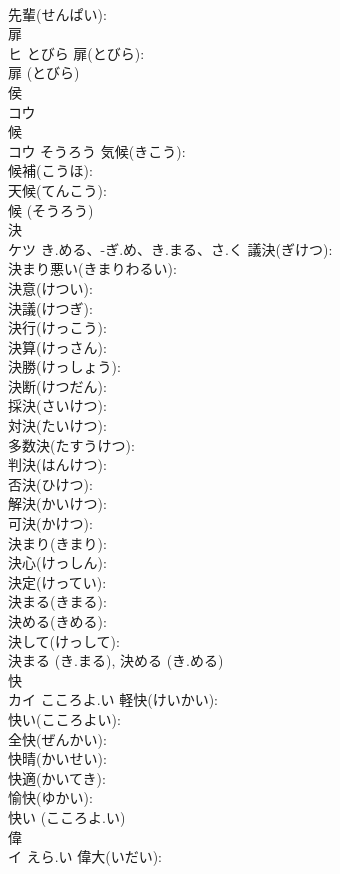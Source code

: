 \documentclass[8pt]{extreport}
\begin{document}
\begin{CJK}{UTF8}{min}
\\	先輩(せんぱい): 
\\	扉			
\\	ヒ	とびら	扉(とびら): 
\\	扉 (とびら)
\\	侯			
\\	コウ			
\\	候			
\\	コウ	そうろう	気候(きこう): 
\\	候補(こうほ): 
\\	天候(てんこう): 
\\	候 (そうろう)
\\	決			
\\	ケツ	き.める、-ぎ.め、き.まる、さ.く	議決(ぎけつ): 
\\	決まり悪い(きまりわるい): 
\\	決意(けつい): 
\\	決議(けつぎ): 
\\	決行(けっこう): 
\\	決算(けっさん): 
\\	決勝(けっしょう): 
\\	決断(けつだん): 
\\	採決(さいけつ): 
\\	対決(たいけつ): 
\\	多数決(たすうけつ): 
\\	判決(はんけつ): 
\\	否決(ひけつ): 
\\	解決(かいけつ): 
\\	可決(かけつ): 
\\	決まり(きまり): 
\\	決心(けっしん): 
\\	決定(けってい): 
\\	決まる(きまる): 
\\	決める(きめる): 
\\	決して(けっして): 
\\	決まる (き.まる), 決める (き.める)
\\	快			
\\	カイ	こころよ.い	軽快(けいかい): 
\\	快い(こころよい): 
\\	全快(ぜんかい): 
\\	快晴(かいせい): 
\\	快適(かいてき): 
\\	愉快(ゆかい): 
\\	快い (こころよ.い)
\\	偉			
\\	イ	えら.い	偉大(いだい): 

\end{CJK}
\end{document}
